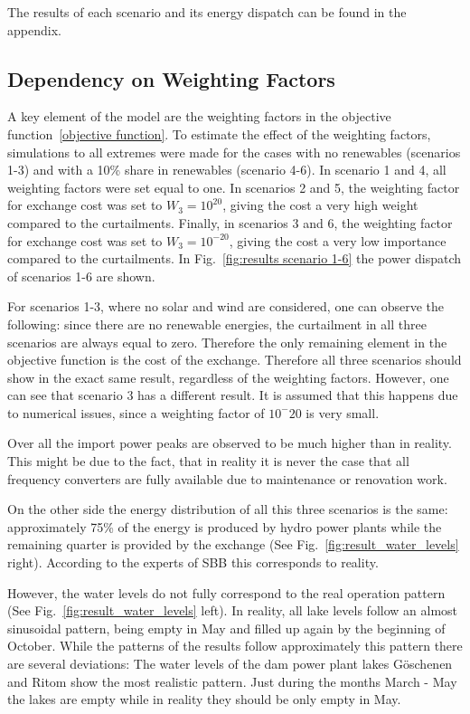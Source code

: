The results of each scenario and its energy dispatch can be found in the appendix. 

\subsection{Dependency on Weighting Factors}\label{chapter_weighting factor}
A key element of the model are the weighting factors in the objective function~\eqref{objective function}. To estimate the effect of the weighting factors, simulations to all extremes were made for the cases with no renewables (scenarios 1-3) and with a 10\% share in renewables (scenario 4-6). In scenario 1 and 4, all weighting factors were set equal to one. In scenarios 2 and 5, the weighting factor for exchange cost was set to $W_3 = 10^{20}$, giving the cost a very high weight compared to the curtailments. Finally, in scenarios 3 and 6, the weighting factor for exchange cost was set to $W_3 = 10^{-20}$, giving the cost a very low importance compared to the curtailments. In Fig.~\ref{fig:results scenario 1-6} the power dispatch of scenarios 1-6 are shown. 

For scenarios 1-3, where no solar and wind are considered, one can observe the following: since there are no renewable energies, the curtailment in all three scenarios are always equal to zero. Therefore the only remaining element in the objective function is the cost of the exchange. Therefore all three scenarios should show in the exact same result, regardless of the weighting factors. However, one can see that scenario 3 has a different result. It is assumed that this happens due to numerical issues, since a weighting factor of $10^-20$ is very small. 

Over all the import power peaks are observed to be much higher than in reality. This might be due to the fact, that in reality it is never the case that all frequency converters are fully available due to maintenance or renovation work. 

On the other side the energy distribution of all this three scenarios is the same: approximately 75\% of the energy is produced by hydro power plants while the remaining quarter is provided by the exchange (See Fig.~\ref{fig:result_water_levels} right). According to the experts of SBB this corresponds to reality.

However, the water levels do not fully correspond to the real operation pattern (See Fig.~\ref{fig:result_water_levels} left). In reality, all lake levels follow an almost sinusoidal pattern, being empty in May and filled up again by the beginning of October. While the patterns of the results follow approximately this pattern there are several deviations: The water levels of the dam power plant lakes Göschenen and Ritom show the most realistic pattern. Just during the months March - May the lakes are empty while in reality they should be only empty in May. 

